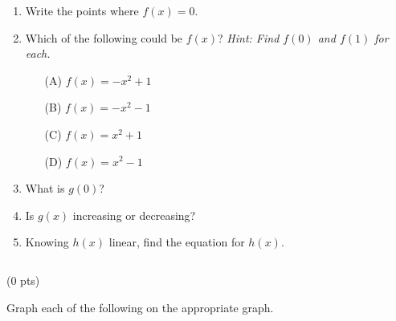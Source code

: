 \documentclass[12pt]{ximera}
\begin{document}
    \begin{enumerate}[label=(\alph*)]
        \item Write the points where $f(x)=0$. \vspace{1cm}
        \item\makebox[0pt][r]{(1 pt) \hspace{0.65cm}} Which of the following could be $f(x)$? \textit{Hint: Find $f(0)$ and $f(1)$ for each.} 
        \begin{enumerate}
            \item[(A)] $f(x)=-x^2+1$
            \item[(B)] $f(x)=-x^2-1$
            \item[(C)] $f(x)=x^2+1$
            \item[(D)] $f(x)=x^2-1$
        \end{enumerate}
        \item What is $g(0)$? \vspace{3cm}
        \item\makebox[0pt][r]{(1 pt) \hspace{0.65cm}} Is $g(x)$ increasing or decreasing? \vspace{1cm}
        \item Knowing $h(x)$ linear, find the equation for $h(x)$.  
    \end{enumerate}

\newpage $\,$
\newpage


 (0 pts)

Graph each of the following on the appropriate graph.
\end{document}
